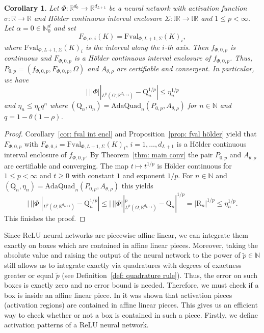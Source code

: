 \documentclass[a4paper, 11pt]{article}
\newtheorem{corollary}[theorem]{Corollary}
\begin{document}
	\begin{corollary}\label{corr:LpNormsconvergenceOfQuadratureRule}
		Let $\Phi : \mathbb{R}^{d_0} \to \mathbb{R}^{d_{L+1}}$ be a neural network with activation function $\sigma : \mathbb{R} \to \mathbb{R}$ and Hölder continuous interval enclosure $\Sigma:\mathbb{IR}\to \mathbb{IR}$ and $1\leq p < \infty$. 
		Let $\alpha = 0 \in \mathbb{N}^d_0$ and set
		$$ F_{\Phi,\alpha,i}(K) = \mathrm{Fval}_{\Phi, L+1, \Sigma}(K)_i,$$
		where $\mathrm{Fval}_{\Phi, L+1, \Sigma}(K)_i$ is the interval along the $i$-th axis.
		Then $f_{\Phi,0,p}$ is continuous and $F_{\Phi,0,p}$ is a Hölder continuous interval enclosure of $f_{\Phi,0,p}$. Thus, $P_{0,p}=(f_{\Phi, 0,p}, F_{\Phi, 0,p}, \Omega)$ and {$A_{\theta, \rho}$} are certifiable and convergent. In particular, we have
		$$ |\, ||\Phi||_{L^p(\Omega; \mathbb{R}^{d_{L+1}})} - \mathrm{Q}_n^{1/p}| \leq \eta_n^{1/p} $$
		and $\eta_n \leq \eta_0 q^n$ where $(\mathrm{Q}_n, \eta_n) = \mathrm{AdaQuad}_n(P_{0,p}, A_{\theta, \rho})$ for $n\in \mathbb{N}$ and $q=1-\theta(1-\rho)$.
	\end{corollary}
	\begin{proof}
		Corollary~\ref{cor: fval int encl} and Proposition~\ref{prop: fval hölder} yield that $F_{\Phi,0,p}$ with $F_{\Phi,0,i} = \mathrm{Fval}_{\Phi, L+1, \Sigma}(K)_i$, $i=1,\dotsc, d_{L+1}$ is a Hölder continuous interval enclosure of $f_{\Phi,0,p}$. By Theorem~\ref{thm: main conv} the pair $P_{0,p}$ and $A_{\theta,\rho}$ are certifiable and converging. The map $t \mapsto t^{1/p}$ is Hölder continuous for $1 \leq p < \infty$ and $t\geq 0$ with constant $1$ and exponent $1/p$. For $n\in \mathbb{N}$ and $(\mathrm{Q}_n, \eta_n) = \mathrm{AdaQuad}_n(P_{0,p}, A_{\theta,\rho})$ this yields
		$$ |\, ||\Phi||_{L^p(\Omega ; \mathbb{R}^{d_{L+1}})}  - \mathrm{Q}_n^{1/p}|\leq  |\, ||\Phi||_{L^p(\Omega ; \mathbb{R}^{d_{L+1}})}^p  - \mathrm{Q}_n|^{1/p} = |\mathrm{R}_n|^{1/p} \leq \eta_n^{1/p}. $$
		This finishes the proof.
	\end{proof}
	
	Since ReLU neural networks are piecewise affine linear, we can integrate them exactly on boxes which are contained in affine linear pieces. Moreover, taking the absolute value and raising the output of the neural network to the power of $\tilde{p}\in \mathbb{N}$ still allows us to integrate exactly via quadratures with degrees of exactness greater or equal $\tilde{p}$ (see Definition~\ref{def: quadrature rule}). Thus, the error on such boxes is exactly zero and no error bound is needed. Therefore, we must check if a box is inside an affine linear piece. In \cite{hanin2019deep} it was shown that activation pieces (activation regions) are contained in affine linear pieces. This gives us an efficient way to check whether or not a box is contained in such a piece. Firstly, we define activation patterns of a ReLU neural network.
	
\end{document}
